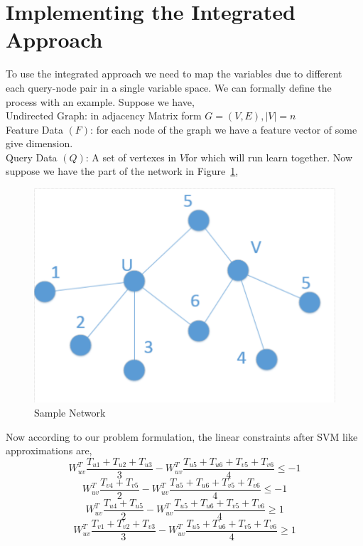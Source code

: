 \section*{Implementing the Integrated Approach}
To use the integrated approach we need to map the variables due to different each query-node pair in a single variable space. We can formally define the process with an example. Suppose we have,
\\Undirected Graph: in adjacency Matrix form $G = (V, E), |V| = n$
\\Feature Data $(F)$: for each node of the graph we have a feature vector of some give dimension.
\\Query Data $(Q)$: A set of vertexes in $V$for which will run learn together.
Now suppose we have the part of the network in Figure~\ref{fig:Sample Network},
\begin{figure}
\centering
\includegraphics[width=\textwidth,height=\textheight,keepaspectratio]{link_prediction/images/network.png}
\caption{Sample Network}
\label{fig:Sample Network}
\end{figure}

Now according to our problem formulation, the linear constraints after SVM like approximations  are,
\begin{equation}
W_{uv}^T \frac{T_{u1} + T_{u2} + T_{u3}}{3} - W_{uv}^T \frac {T_{u5} + T_{u6}+T_{v5} + T_{v6}}{4} \leq -1 
\end{equation}
\begin{equation}
W_{uv}^T \frac{T_{v4} + T_{v5}}{2} - W_{uv}^T \frac {T_{u5} + T_{u6}+T_{v5} + T_{v6}}{4} \leq -1 
\end{equation}
\begin{equation}
W_{uv}^T \frac{T_{u4} + T_{u5}}{2} - W_{uv}^T \frac {T_{u5} + T_{u6}+T_{v5} + T_{v6}}{4} \geq 1 
\end{equation}
\begin{equation}
W_{uv}^T \frac{T_{v1} + T_{v2} + T_{v3}}{3} - W_{uv}^T \frac {T_{u5} + T_{u6}+T_{v5} + T_{v6}}{4} \geq 1 
\end{equation}

